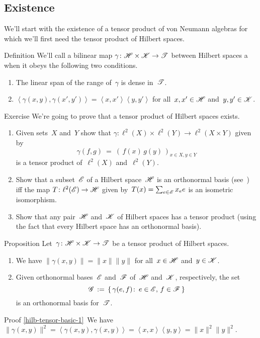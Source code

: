 \documentclass[a]{subfiles}
\begin{document}
\subsection{Existence}
\begin{parsec}%
\begin{point}%
We'll start with the existence
of a tensor product of von Neumann algebras
for which we'll first need the tensor product
of Hilbert spaces.
\end{point}
\begin{point}{Definition}%
We'll call a bilinear map $\gamma\colon \mathscr{H}\times\mathscr{K}\to\mathscr{T}$
between Hilbert spaces
a 
when it obeys the following two conditions.
\begin{enumerate}
\item
The linear span of the range of~$\gamma$ is dense in~$\mathscr{T}$.
\item
$\left<\gamma(x,y),\gamma(x',y')\right>
= \left<x,x'\right> \left<y,y'\right>$
for all~$x,x'\in\mathscr{H}$ and~$y,y'\in\mathscr{K}$.
\end{enumerate}
\end{point}
\begin{point}{Exercise}%
We're going to prove that a tensor product of Hilbert spaces
exists.
\begin{enumerate}
\item
Given sets~$X$ and~$Y$
show that  $\gamma\colon\ell^2(X)\times \ell^2(Y)\to \ell^2(X\times Y)$
given by
\begin{equation*}
	\gamma(f,g)\ = \ (\,f(x)\,g(y)\,)_{x\in X,y\in Y}
\end{equation*}
is a tensor product of~$\ell^2(X)$ and~$\ell^2(Y)$.
\item
Show that a subset~$\mathscr{E}$ of a Hilbert space~$\mathscr{H}$
is an orthonormal basis (see~) iff
the map $T\colon \ell^2(\mathscr{E})\to\mathscr{H}$
given by~$T(x)=\sum_{e\in\mathscr{E}} x_e e$
is an isometric isomorphism.
\item
Show that any pair~$\mathscr{H}$ and~$\mathscr{K}$
of Hilbert spaces has a tensor product
(using the fact that every Hilbert space
has an orthonormal basis).
\end{enumerate}
\end{point}
\begin{point}{Proposition}%
Let~$\gamma\colon \mathscr{H}\times\mathscr{K}\to\mathscr{T}$
be a tensor product
of Hilbert spaces.
\begin{enumerate}
\item
\label{hilb-tensor-basic-1}
We have $\|\gamma(x,y)\|=\|x\|\|y\|$
for all~$x\in\mathscr{H}$ and~$y\in\mathscr{K}$.
\item
\label{hilb-tensor-basic-2}
Given orthonormal bases~$\mathscr{E}$ and~$\mathscr{F}$
of~$\mathscr{H}$ and~$\mathscr{K}$, respectively,
the set
\begin{equation*}
	\mathscr{G}\,:=\,\{\,\gamma(e,f)\colon \,e\in \mathscr{E},\,f\in\mathscr{F}\,\}
\end{equation*}
is an orthonormal basis for~$\mathscr{T}$.
\end{enumerate}
\begin{point}{Proof}%
\ref{hilb-tensor-basic-1}\ 
We have $\|\gamma(x,y)\|^2
= \left<\gamma(x,y),\gamma(x,y)\right>
=\left<x,x\right>\left<y,y\right>
= \|x\|^2\|y\|^2$.


\end{point}
\end{point}
\end{parsec}
\end{document}
